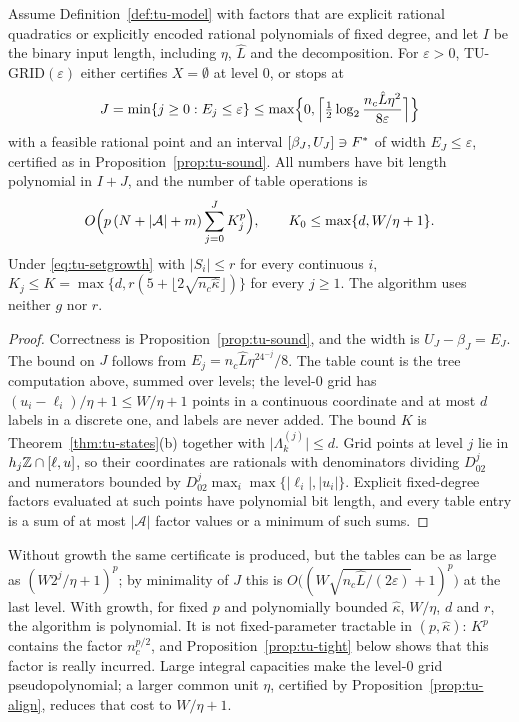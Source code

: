 \begin{theorem}\label{thm:tu-approx}
Assume Definition~\ref{def:tu-model} with factors that are explicit rational
quadratics or explicitly encoded rational polynomials of fixed degree, and
let $I$ be the binary input length, including $\eta$, $\hat L$ and the
decomposition. For $\varepsilon>0$, TU-GRID$(\varepsilon)$ either certifies
$X=\emptyset$ at level $0$, or stops at
\[
J=\min\{j\ge0:E_j\le\varepsilon\}\le
\max\Bigl\{0,\Bigl\lceil\tfrac12\log_2\frac{n_c\hat L\eta^2}{8\varepsilon}\Bigr\rceil\Bigr\}
\]
with a feasible rational point and an interval $[\beta_J,U_J]\ni F^*$ of width
$E_J\le\varepsilon$, certified as in Proposition~\ref{prop:tu-sound}. All
numbers have bit length polynomial in $I+J$, and the number of table
operations is
\[
O\Bigl(p\,(N+\lvert\mathcal A\rvert+m)\sum_{j=0}^JK_j^p\Bigr),\qquad
K_0\le\max\{d,W/\eta+1\}.
\]
Under \eqref{eq:tu-setgrowth} with $\lvert S_i\rvert\le r$ for every continuous
$i$, $K_j\le K=\max\{d,r(5+\lfloor2\sqrt{n_c\hat\kappa}\rfloor)\}$ for every
$j\ge1$. The algorithm uses neither $g$ nor $r$.
\end{theorem}

\begin{proof}
Correctness is Proposition~\ref{prop:tu-sound}, and the width is
$U_J-\beta_J=E_J$. The bound on $J$ follows from $E_j=n_c\hat L\eta^24^{-j}/8$.
The table count is the tree computation above, summed over levels; the
level-$0$ grid has $(u_i-\ell_i)/\eta+1\le W/\eta+1$ points in a continuous
coordinate and at most $d$ labels in a discrete one, and labels are never
added. The bound $K$ is Theorem~\ref{thm:tu-states}(b) together with
$\lvert\Lambda^{(j)}_k\rvert\le d$. Grid points at level $j$ lie in
$h_j\mathbb Z\cap[\ell,u]$, so their coordinates are rationals with denominators
dividing $D_02^j$ and numerators bounded by $D_02^j\max_i\max\{\lvert\ell_i\rvert,\lvert u_i\rvert\}$.
Explicit fixed-degree factors evaluated at such points have polynomial bit
length, and every table entry is a sum of at most $\lvert\mathcal A\rvert$ factor
values or a minimum of such sums.
\end{proof}

Without growth the same certificate is produced, but the tables can be as
large as $(W2^j/\eta+1)^p$; by minimality of $J$ this is
$O\bigl((W\sqrt{n_c\hat L/(2\varepsilon)}+1)^p\bigr)$ at the last level. With
growth, for fixed $p$ and polynomially bounded $\hat\kappa$, $W/\eta$, $d$ and $r$, the
algorithm is polynomial. It is not fixed-parameter tractable in
$(p,\hat\kappa)$: $K^p$ contains the factor $n_c^{p/2}$, and
Proposition~\ref{prop:tu-tight} below shows that this factor is really
incurred. Large integral capacities make the level-$0$ grid
pseudopolynomial; a larger common unit $\eta$, certified by
Proposition~\ref{prop:tu-align}, reduces that cost to $W/\eta+1$.

